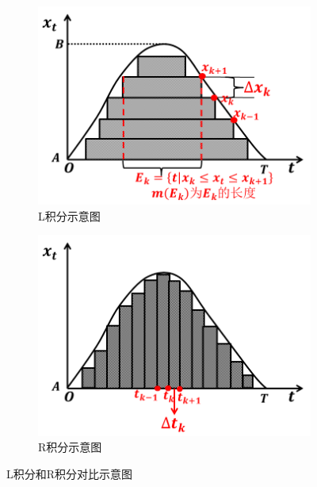             \begin{figure}[H]
            \centering
                \begin{subfigure}[b]{0.3\textwidth}
                \includegraphics[width=\textwidth]{images/L_Integral.jpg}
                \caption{L积分示意图}
                \label{fig:L积分示意图}
                \end{subfigure}
            \qquad
                \begin{subfigure}[b]{0.3\textwidth}
                \includegraphics[width=\textwidth]{images/R_Integral.jpg}
                \caption{R积分示意图}
                \label{fig:R积分示意图}
                \end{subfigure}
            \caption{L积分和R积分对比示意图}
            \label{fig:L积分和R积分对比示意图}
            \end{figure}

